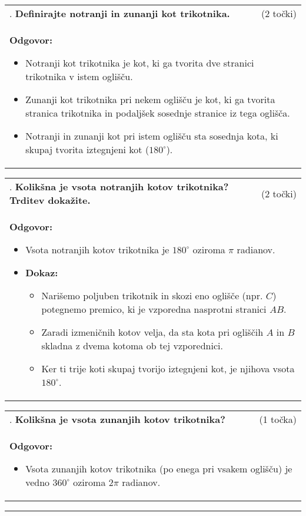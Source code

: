 \documentclass[12pt]{article}
\newcounter{vprasanje}[section]
\renewcommand{\thevprasanje}{\roman{vprasanje}}
\newcommand{\vprasanje}[2]{%
  \stepcounter{vprasanje}%
  \textbf{\thevprasanje}. \textbf{#1} & (#2) \\
}
\newcommand{\odgovor}[1]{%
  \multicolumn{2}{p{\dimexpr\textwidth-2\tabcolsep\relax}}{%
    \small \textbf{Odgovor:} #1%
  } \\[1em]%
}
\newcommand{\crta}{\rule{\textwidth}{0.4pt}}
\newcommand{\razmak}[1]{%
  \vspace{#1}
}
\begin{document}
\begin{tabularx}{\textwidth}{X r}
\vprasanje{Definirajte notranji in zunanji kot trikotnika.}{2 točki}
\odgovor{
\begin{itemize}
    \item Notranji kot trikotnika je kot, ki ga tvorita dve stranici trikotnika v istem oglišču.
    \item Zunanji kot trikotnika pri nekem oglišču je kot, ki ga tvorita stranica trikotnika in podaljšek sosednje stranice iz tega oglišča.
    \item Notranji in zunanji kot pri istem oglišču sta sosednja kota, ki skupaj tvorita iztegnjeni kot ($180^\circ$).
\end{itemize}
}
\end{tabularx}

\begin{tabularx}{\textwidth}{X r}
\vprasanje{Kolikšna je vsota notranjih kotov trikotnika? Trditev dokažite.}{2 točki}
\odgovor{
\begin{itemize}
    \item Vsota notranjih kotov trikotnika je $180^\circ$ oziroma $\pi$ radianov.
    \item \textbf{Dokaz:}
    \begin{itemize}
        \item Narišemo poljuben trikotnik in skozi eno oglišče (npr. $C$) potegnemo premico, ki je vzporedna nasprotni stranici $AB$.
        \item Zaradi izmeničnih kotov velja, da sta kota pri ogliščih $A$ in $B$ skladna z dvema kotoma ob tej vzporednici.
        \item Ker ti trije koti skupaj tvorijo iztegnjeni kot, je njihova vsota $180^\circ$.
    \end{itemize}
\end{itemize}
}
\end{tabularx}

\begin{tabularx}{\textwidth}{X r}
\vprasanje{Kolikšna je vsota zunanjih kotov trikotnika?}{1 točka}
\odgovor{
\begin{itemize}
    \item Vsota zunanjih kotov trikotnika (po enega pri vsakem oglišču) je vedno $360^\circ$ oziroma $2\pi$ radianov.
\end{itemize}
}
\end{tabularx}

\razmak{0.5em}


\crta
\end{document}
